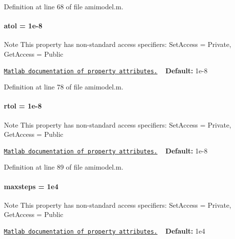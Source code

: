 Definition at line 68 of file amimodel.\+m.

\hypertarget{classamimodel_a0c5f3dcf809a17b895fe12fc91272349}{}
\paragraph[{atol}]{\setlength{\rightskip}{0pt plus 5cm}atol = 1e-\/8}\label{classamimodel_a0c5f3dcf809a17b895fe12fc91272349}
\begin{DoxyNote}{Note}
This property has non-\/standard access specifiers\+: {\ttfamily Set\+Access = Private, Get\+Access = Public} 

\href{http://www.mathworks.com/help/matlab/matlab_oop/property-attributes.html}{\tt Matlab documentation of property attributes.} ~\newline
{\bfseries Default\+:} 1e-\/8 
\end{DoxyNote}


Definition at line 78 of file amimodel.\+m.

\hypertarget{classamimodel_a7978e9a4674f869e6b2950e2f6262ca5}{}
\paragraph[{rtol}]{\setlength{\rightskip}{0pt plus 5cm}rtol = 1e-\/8}\label{classamimodel_a7978e9a4674f869e6b2950e2f6262ca5}
\begin{DoxyNote}{Note}
This property has non-\/standard access specifiers\+: {\ttfamily Set\+Access = Private, Get\+Access = Public} 

\href{http://www.mathworks.com/help/matlab/matlab_oop/property-attributes.html}{\tt Matlab documentation of property attributes.} ~\newline
{\bfseries Default\+:} 1e-\/8 
\end{DoxyNote}


Definition at line 89 of file amimodel.\+m.

\hypertarget{classamimodel_ac37622882dacee1f11688d4941ccb45e}{}
\paragraph[{maxsteps}]{\setlength{\rightskip}{0pt plus 5cm}maxsteps = 1e4}\label{classamimodel_ac37622882dacee1f11688d4941ccb45e}
\begin{DoxyNote}{Note}
This property has non-\/standard access specifiers\+: {\ttfamily Set\+Access = Private, Get\+Access = Public} 

\href{http://www.mathworks.com/help/matlab/matlab_oop/property-attributes.html}{\tt Matlab documentation of property attributes.} ~\newline
{\bfseries Default\+:} 1e4 
\end{DoxyNote}


